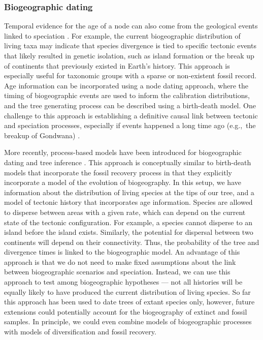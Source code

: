 
\subsubsection{Biogeographic dating}

Temporal evidence for the age of a node can also come from the geological events linked to speciation \citep{Ho2015,deBaets2016}.
For example, the current biogeographic distribution of living taxa may indicate that species divergence is tied to specific tectonic events that likely resulted in genetic isolation, such as island formation or the break up of continents that previously existed  in Earth's history.
This approach is especially useful for taxonomic groups with a sparse or non-existent fossil record.
Age information can be incorporated using a node dating approach, where the timing of biogeographic events are used to inform the calibration distributions, and the tree generating process can be described using a birth-death model.
One challenge to this approach is establishing a definitive causal link between tectonic and speciation processes, especially if events happened a long time ago (e.g.,\ the breakup of Gondwana) \citep{deBaets2016}.

More recently, process-based models have been introduced for biogeographic dating and tree inference \citep{Landis2016,Landis2019}.
This approach is conceptually similar to birth-death models that incorporate the fossil recovery process in that they explicitly incorporate a model of the evolution of biogeography.
In this setup, we have information about the distribution of living species at the tips of our tree, and a model of tectonic history that incorporates age information.
Species are allowed to disperse between areas with a given rate, which can depend on the current state of the tectonic configuration.
For example, a species cannot disperse to an island before the island exists.
Similarly, the potential for dispersal between two continents will depend on their connectivity.
Thus, the probability of the tree and divergence times is linked to the biogeographic model.
An advantage of this approach is that we do not need to make fixed assumptions about the link between biogeographic scenarios and speciation.
Instead, we can use this approach to test among biogeographic hypotheses --- not all histories will be equally likely to have produced the current distribution of living species.
So far this approach has been used to date trees of extant species only, however, future extensions could potentially account for the biogeography of extinct and fossil samples.
In principle, we could even combine models of biogeographic processes with models of diversification and fossil recovery.

